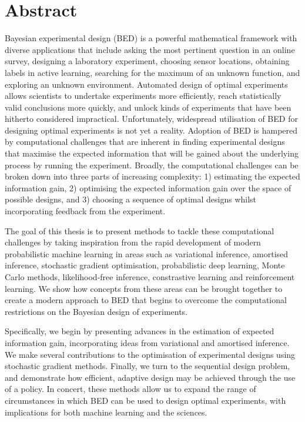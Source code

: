 \documentclass[a4paper, 10pt]{report}
\theoremstyle{plain}
\theoremstyle{definition}
\theoremstyle{remark}
\begin{document}
	
	
	
	\newpage
	\chapter*{Abstract}
	Bayesian experimental design (BED) is a powerful mathematical framework with diverse applications that include asking the most pertinent question in an online survey, designing a laboratory experiment, choosing sensor locations, obtaining labels in active learning, searching for the maximum of an unknown function, and exploring an unknown environment.
	Automated design of optimal experiments allows scientists to undertake experiments more efficiently, reach statistically valid conclusions more quickly, and unlock kinds of experiments that have been hitherto considered impractical.
	Unfortunately, widespread utilisation of BED for designing optimal experiments is not yet a reality.
	Adoption of BED is hampered by computational challenges that are inherent in finding experimental designs that maximise the expected information that will be gained about the underlying process by running the experiment.
	Broadly, the computational challenges can be broken down into three parts of increasing complexity: 1) estimating the expected information gain, 2) optimising the expected information gain over the space of possible designs, and 3) choosing a sequence of optimal designs whilst incorporating feedback from the experiment.
	
	The goal of this thesis is to present methods to tackle these computational challenges by taking inspiration from the rapid development of modern probabilistic machine learning in areas such as variational inference, amortised inference, stochastic gradient optimisation, probabilistic deep learning, Monte Carlo methods, likelihood-free inference, constrastive learning and reinforcement learning.
	We show how concepts from these areas can be brought together to create a modern approach to BED that begins to overcome the computational restrictions on the Bayesian design of experiments.
	
	Specifically, we begin by presenting advances in the estimation of expected information gain, incorporating ideas from variational and amortised inference.
	We make several contributions to the optimisation of experimental designs using stochastic gradient methods.
	Finally, we turn to the sequential design problem, and demonstrate how efficient, adaptive design may be achieved through the use of a policy.
	In concert, these methods allow us to expand the range of circumstances in which BED can be used to design optimal experiments, with implications for both machine learning and the sciences.
\end{document}
